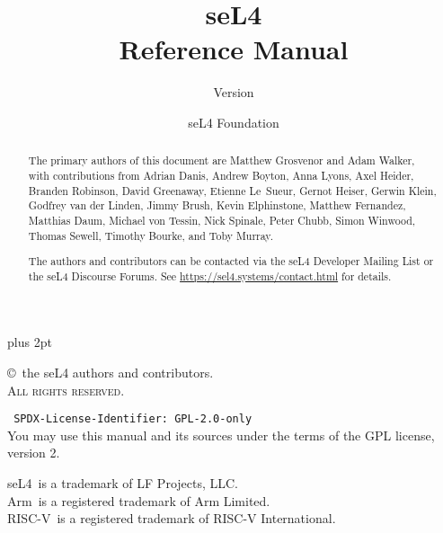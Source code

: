 \documentclass[english,a4paper,11pt,twoside]{report}
\date{}
\date{}
\newcommand{\version}{}
\newcommand{\rtm}{\textsuperscript{\textregistered}}
\begin{document}
  \title{seL4\\ Reference Manual}
  \subtitle{Version \version}

  \author{seL4 Foundation}
  \date{\commitdate}

  \maketitle

  \thispagestyle{empty}

  \vfill

  \parindent 0pt\parskip 6pt plus 2pt

  \copyright\ the seL4 authors and contributors.\\
  \textsc{All rights reserved}.

  \vspace{2ex}
  \texttt{%
  SPDX-License-Identifier: GPL-2.0-only
  }\\
  You may use this manual and its sources under the terms of the GPL license, version 2.

  \vspace{2ex}
  seL4\rtm\ is a trademark of LF Projects, LLC.\\
  Arm\rtm\ is a registered trademark of Arm Limited.\\
  RISC-V\rtm\ is a registered trademark of RISC-V International.

  \thispagestyle{empty}
  \vfill
  \renewcommand{\abstractname}{Acknowledgements}
  \begin{abstract}
The primary authors of this document are Matthew Grosvenor and Adam Walker,
with contributions from
Adrian Danis,
Andrew Boyton,
Anna Lyons,
Axel Heider,
Branden Robinson,
David Greenaway,
Etienne Le~Sueur,
Gernot Heiser,
Gerwin Klein,
Godfrey van der Linden,
Jimmy Brush,
Kevin Elphinstone,
Matthew Fernandez,
Matthias Daum,
Michael von Tessin,
Nick Spinale,
Peter Chubb,
Simon Winwood,
Thomas Sewell,
Timothy Bourke, and
Toby Murray.

The authors and contributors can be contacted via the seL4 Developer Mailing
List or the seL4 Discourse Forums. See \url{https://sel4.systems/contact.html}
for details.
  \end{abstract}
  \thispagestyle{empty}
\end{document}
